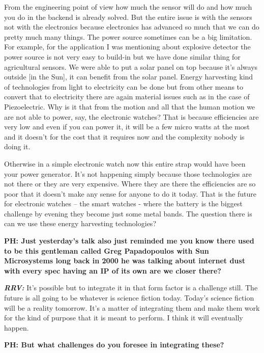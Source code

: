 \begin{multicols}{2}
From the engineering point of view how much the sensor will do and how much you do in the backend is already solved. But the entire issue is with the sensors not with the electronics because electronics has advanced so much that we can do pretty much many things. The power source sometimes can be a big limitation. For example, for the application I was mentioning about explosive detector the power source is not very easy to build-in but we have done similar thing for agricultural sensors. We were able to put a solar panel on top because it’s always outside [in the Sun], it can benefit from the solar panel.  Energy harvesting kind of technologies from light to electricity can be done but from other means to convert that to electricity there are again material issues such as in the case of Piezoelectric. Why is it that from the motion and all that the human motion we are not able to power, say, the electronic watches? That is because efficiencies are very low and even if you can power it, it will be a few micro watts at the most and it doesn’t for the cost that it requires now and the complexity nobody is doing it.

\vskip -0.2cm

Otherwise in a simple electronic watch now this entire strap would have been your power generator. It’s not happening simply because those technologies are not there or they are very expensive. Where they are there the efficiencies are so poor that it doesn’t make any sense for anyone to do it today. That is the future for electronic watches -- the smart watches - where the battery is the biggest challenge by evening they become just some metal bands. The question there is can we use these energy harvesting technologies?

\textbf{PH: Just yesterday’s talk also just reminded me you know there used to be this gentleman called Greg Papadopoulos with Sun Microsystems long back in 2000 he was talking about internet dust with every spec having an IP of its own are we closer there? }

\textbf{\textit{RRV:}} It’s possible but to integrate it in that form factor is a challenge still. The future is all going to be whatever is science fiction today. Today’s science fiction will be a reality tomorrow. It’s a matter of integrating them and make them work for the kind of purpose that it is meant to perform. I think it will eventually happen.

\textbf{PH: But what challenges do you foresee in integrating these? }


\end{multicols}
